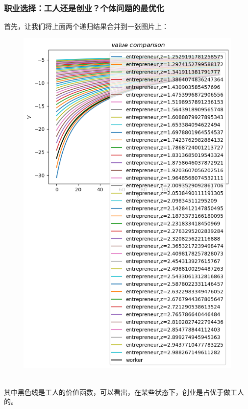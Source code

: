 \documentclass[a4paper, 12pt]{ctexart}
\begin{document}
\begin{figure}[h]
    \centering
    \nonumber
\end{figure}
\subsubsection{职业选择：工人还是创业？个体问题的最优化}
首先，让我们将上面两个递归结果合并到一张图片上： 
\begin{figure}[h]
    \centering
    \includegraphics[width=0.5\linewidth]{pic/5.png}
    \nonumber
    \label{fig:enter-label}
\end{figure}
\\ 其中黑色线是工人的价值函数，可以看出，在某些状态下，创业是占优于做工人的。
\end{document}
